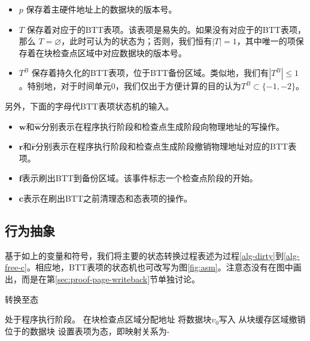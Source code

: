 \begin{itemize}
\item $p$ 保存着主硬件地址上的数据块的版本号。
\item $T$ 保存着对应于的BTT表项。该表项是易失的。如果没有对应于的BTT表项，那么
$T=\varnothing$，此时可认为的状态为；否则，我们恒有$\left\vert{T}\right\vert = 1$，其中唯一的项保存着在块检查点区域中对应数据块的版本号。
\item $T^B$ 保存着持久化的BTT表项，位于BTT备份区域。类似地，我们有$\left\vert{T^B}\right\vert \le 1$。特别地，对于时间单元$0$，我们仅出于方便计算的目的认为$T^B \subset \{-1, -2\}$。
\end{itemize}

另外，下面的字母代BTT表项状态机的输入。

\begin{itemize}
\item $\mathbf{w}$和$\mathbf{\hat{w}}$分别表示在程序执行阶段和检查点生成阶段向物理地址的写操作。
\item $\mathbf{r}$和$\mathbf{\hat{r}}$分别表示在程序执行阶段和检查点生成阶段撤销物理地址对应的BTT表项。
\item $\mathbf{f}$表示刷出BTT到备份区域。该事件标志一个检查点阶段的开始。
\item $\mathbf{c}$表示在刷出BTT之前清理态和态表项的操作。
\end{itemize}

\subsection{行为抽象}

基于如上的变量和符号，我们将主要的状态转换过程表述为过程\ref{alg-dirty}到\ref{alg-free-c}。相应地，BTT表项的状态机也可改写为图\ref{fig:asm}。注意态没有在图中画出，而是在第\ref{sec:proof-page-writeback}节单独讨论。

\begin{algorithm} [!h]
\caption{转换至态}
\label{alg-dirty}
\begin{algorithmic}[1]
\Require 处于程序执行阶段。
\State 在块检查点区域分配地址
\State 将数据块$v_0$写入
  \State 从块缓存区域撤销位于的数据块
\EndIf
\State 设置表项为态，即映射关系为- 
\end{algorithmic}
\end{algorithm}

